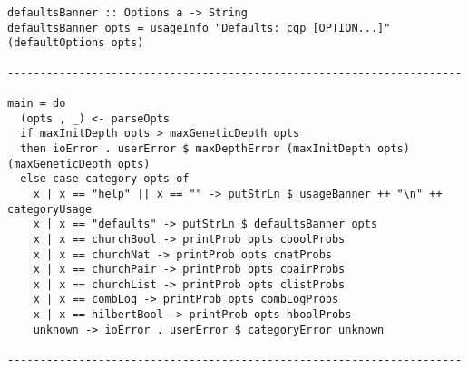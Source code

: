 \documentclass{article}
\newcommand{\n}[1]{\textrm{#1}}
\begin{document}
\begin{lstlisting}
defaultsBanner :: Options a -> String
defaultsBanner opts = usageInfo "Defaults: cgp [OPTION...]" (defaultOptions opts)

----------------------------------------------------------------------

main = do
  (opts , _) <- parseOpts
  if maxInitDepth opts > maxGeneticDepth opts
  then ioError . userError $ maxDepthError (maxInitDepth opts) (maxGeneticDepth opts)
  else case category opts of
    x | x == "help" || x == "" -> putStrLn $ usageBanner ++ "\n" ++ categoryUsage
    x | x == "defaults" -> putStrLn $ defaultsBanner opts
    x | x == churchBool -> printProb opts cboolProbs
    x | x == churchNat -> printProb opts cnatProbs
    x | x == churchPair -> printProb opts cpairProbs
    x | x == churchList -> printProb opts clistProbs
    x | x == combLog -> printProb opts combLogProbs
    x | x == hilbertBool -> printProb opts hboolProbs
    unknown -> ioError . userError $ categoryError unknown

----------------------------------------------------------------------
\end{lstlisting}
\end{document}
